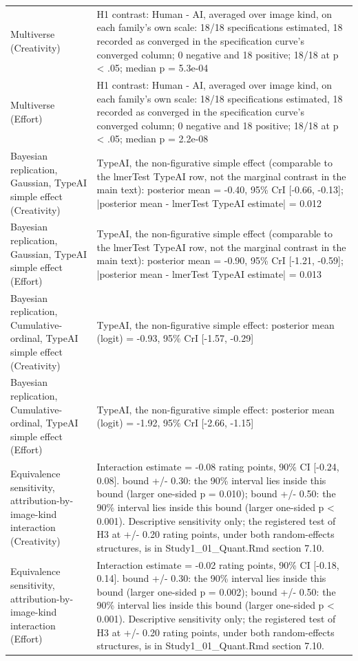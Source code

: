 \begin{table}[!h]
\begin{tabular}[t]{l>{\raggedright\arraybackslash}p{10cm}}
Multiverse (Creativity) & H1 contrast: Human - AI, averaged over image kind, on each family's own scale: 18/18 specifications estimated, 18 recorded as converged in the specification curve's converged column; 0 negative and 18 positive; 18/18 at p < .05; median p = 5.3e-04\\
Multiverse (Effort) & H1 contrast: Human - AI, averaged over image kind, on each family's own scale: 18/18 specifications estimated, 18 recorded as converged in the specification curve's converged column; 0 negative and 18 positive; 18/18 at p < .05; median p = 2.2e-08\\
Bayesian replication, Gaussian, TypeAI simple effect (Creativity) & TypeAI, the non-figurative simple effect (comparable to the lmerTest TypeAI row, not the marginal contrast in the main text): posterior mean = -0.40, 95\% CrI [-0.66, -0.13]; |posterior mean - lmerTest TypeAI estimate| = 0.012\\
\addlinespace
Bayesian replication, Gaussian, TypeAI simple effect (Effort) & TypeAI, the non-figurative simple effect (comparable to the lmerTest TypeAI row, not the marginal contrast in the main text): posterior mean = -0.90, 95\% CrI [-1.21, -0.59]; |posterior mean - lmerTest TypeAI estimate| = 0.013\\
Bayesian replication, Cumulative-ordinal, TypeAI simple effect (Creativity) & TypeAI, the non-figurative simple effect: posterior mean (logit) = -0.93, 95\% CrI [-1.57, -0.29]\\
Bayesian replication, Cumulative-ordinal, TypeAI simple effect (Effort) & TypeAI, the non-figurative simple effect: posterior mean (logit) = -1.92, 95\% CrI [-2.66, -1.15]\\
Equivalence sensitivity, attribution-by-image-kind interaction (Creativity) & Interaction estimate = -0.08 rating points, 90\% CI [-0.24, 0.08]. bound +/- 0.30: the 90\% interval lies inside this bound (larger one-sided p = 0.010); bound +/- 0.50: the 90\% interval lies inside this bound (larger one-sided p < 0.001). Descriptive sensitivity only; the registered test of H3 at +/- 0.20 rating points, under both random-effects structures, is in Study1\_01\_Quant.Rmd section 7.10.\\
Equivalence sensitivity, attribution-by-image-kind interaction (Effort) & Interaction estimate = -0.02 rating points, 90\% CI [-0.18, 0.14]. bound +/- 0.30: the 90\% interval lies inside this bound (larger one-sided p = 0.002); bound +/- 0.50: the 90\% interval lies inside this bound (larger one-sided p < 0.001). Descriptive sensitivity only; the registered test of H3 at +/- 0.20 rating points, under both random-effects structures, is in Study1\_01\_Quant.Rmd section 7.10.\\
\bottomrule
\end{tabular}
\end{table}
